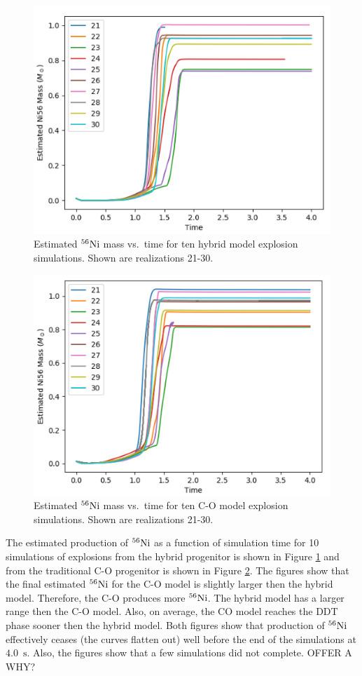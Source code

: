 \documentclass[iop,apj]{emulateapj}
\newcommand{\Ni}[1]{\ensuremath{{}^{#1}{\rm Ni}}}
\newcommand{\unitstyle}[1]{\ensuremath{\mathrm{#1}}}
\newcommand{\second}{\unitstyle{s}}
\begin{document}
\begin{figure}
\includegraphics[width=\columnwidth]{figures/ni56_vs_time_hybrid.png}
\caption{\label{fig:nithybrid}
Estimated \Ni{56} mass vs.\ time for ten hybrid model explosion simulations. 
Shown are realizations 21-30. 
}
\end{figure}
\begin{figure}
\includegraphics[width=\columnwidth]{figures/ni56_vs_time_CO.png}
\caption{\label{fig:nitco}
Estimated \Ni{56} mass vs.\ time for ten C-O model explosion simulations.
Shown are realizations 21-30. 
}
\end{figure}

The estimated production of \Ni{56} as a function of simulation time
for 10 simulations of explosions from the hybrid progenitor is shown
in Figure \ref{fig:nithybrid} and from the traditional C-O progenitor is
shown in Figure \ref{fig:nitco}.
The figures show that the final estimated \Ni{56} for the C-O model is
slightly larger then the hybrid model. Therefore, the C-O produces more
\Ni{56}. The hybrid model has a larger range then the C-O model. Also, on
average, the CO model reaches the DDT phase sooner then the hybrid model.
Both figures show that production of \Ni{56} effectively ceases (the
curves flatten out) well before the end of the simulations at 
$4.0$~\second. Also, the figures show that a few simulations
did not complete. {\color{red} OFFER A WHY?}
\end{document}
